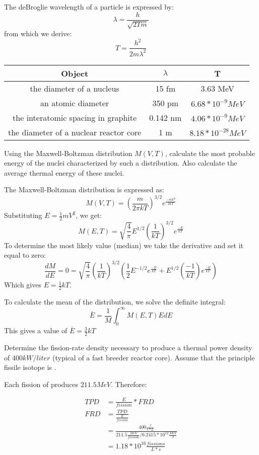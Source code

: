 \documentclass{hw}
\begin{document}
\solution
	The deBroglie wavelength of a particle is expressed by:
	\[ \lambda = \frac{h}{\sqrt{2Tm}} \]
	from which we derive:
	\[ T = \frac{h^2}{2m{\lambda}^2} \]
	
	\begin{table}[h]
		\begin{tabular}{ |c|c|c| }
			\hline
			Object & $ \lambda $ & T \\
			\hline
			the diameter of a nucleus & 15 fm & 3.63 MeV \\
			an atomic diameter & 350 pm & $ 6.68 * 10^{-9} MeV $ \\
			the interatomic spacing in graphite & 0.142 nm & $ 4.06*10^{-9} MeV $ \\
			the diameter of a nuclear reactor core & 1 m & $ 8.18*10^{-28} MeV $ \\
			\hline
		\end{tabular}
	\end{table}

	Using the Maxwell-Boltzman distribution $ M(V,T) $, calculate the most probable energy of the nuclei characterized by such a distribution. Also calculate the average thermal energy of these nuclei.

\solution
	The Maxwell-Boltzman distribution is expressed as:
		\[
			M(V, T) = \left( \frac{m}{2 \pi k T} \right) ^ {3/2} e^{\frac{-mV^2}{2 k T}}
		\]
			Substituting $ E = \frac{1}{2}mV^2 $, we get:
		\[
			M(E, T) = \sqrt{\frac{4}{\pi}} E^{1/2} \left( \frac{1}{kT} \right)^{3/2} e^{\frac{-E}{kT}}
		\]
		To determine the most likely value (median) we take the derivative and set it equal to zero:
		\[
			\frac{dM}{dE} = 0 = \sqrt{\frac{4}{\pi}} \left( \frac{1}{kT} \right)^{3/2} \left( \frac{1}{2} E^{-1/2} e^{\frac{-E}{kT}} + E^{1/2} \left( \frac{-1}{kT} \right) e^{\frac{-E}{kT}}\right)
		\]
		Which gives $ E = \frac{1}{2} k T $.
		
		To calculate the mean of the distribution, we solve the definite integral:
		\[
			\bar{E} = \frac{1}{M} \int^{\infty}_0 M(E, T) E dE	
		\]
		This gives a value of $ \bar{E} = \frac{3}{2} kT $

	Determine the fission-rate density necessary to produce a thermal power density of $ 400 kW/liter $ (typical of a fast breeder reactor core). Assume that the principle fissile isotope is .

\solution
	Each fission of  produces $ 211.5 MeV $. Therefore:
	
	\begin{align*}
		TPD &= \frac{E}{fission} * FRD \\
		FRD &= \frac{TPD}{\frac{E}{fission}} \\
		&= \frac{400 \frac{J}{s*L}}{211.5 \frac{MeV}{fission} / 6.2415*10^{12} \frac{MeV}{J}} \\
		&= 1.18*10^{16} \frac{fissions}{L*s}
	\end{align*}
\end{document}
